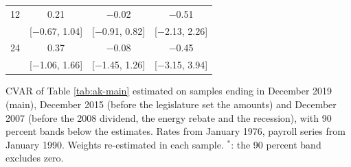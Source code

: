 \begin{table}[htbp]
\begin{tabular}{lccc}
12 & 0.21 & $-$0.02 & $-$0.51 \\
 & [$-$0.67, 1.04] & [$-$0.91, 0.82] & [$-$2.13, 2.26] \\
24 & 0.37 & $-$0.08 & $-$0.45 \\
 & [$-$1.06, 1.66] & [$-$1.45, 1.26] & [$-$3.15, 3.94] \\
\bottomrule
\end{tabular}
\par\smallskip\parbox{0.95\textwidth}{\footnotesize CVAR of Table \ref{tab:ak-main} estimated on samples ending in December 2019 (main), December 2015 (before the legislature set the amounts) and December 2007 (before the 2008 dividend, the energy rebate and the recession), with 90 percent bands below the estimates. Rates from January 1976, payroll series from January 1990. Weights re-estimated in each sample. $^{*}$: the 90 percent band excludes zero.}
\end{table}
